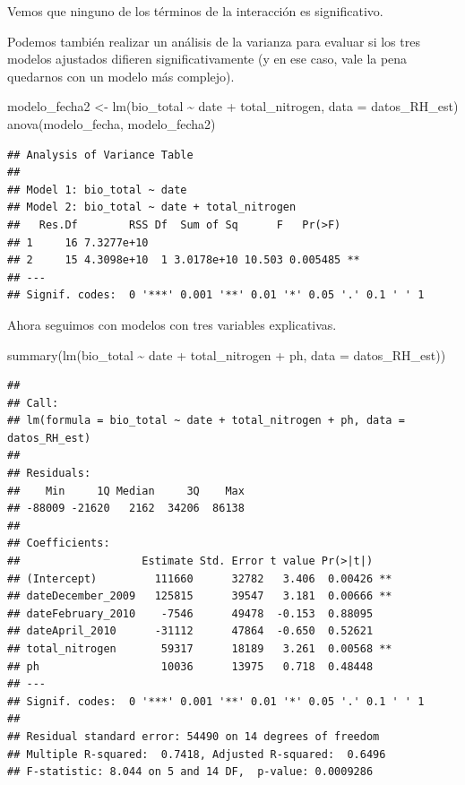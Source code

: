 \documentclass[
]{book}
\newenvironment{Shaded}{\begin{snugshade}}{\end{snugshade}}
\newcommand{\AttributeTok}[1]{\textcolor[rgb]{0.77,0.63,0.00}{#1}}
\newcommand{\FunctionTok}[1]{\textcolor[rgb]{0.00,0.00,0.00}{#1}}
\newcommand{\NormalTok}[1]{#1}
\newcommand{\OtherTok}[1]{\textcolor[rgb]{0.56,0.35,0.01}{#1}}
\newcommand{\SpecialCharTok}[1]{\textcolor[rgb]{0.00,0.00,0.00}{#1}}
\begin{document}
Vemos que ninguno de los términos de la interacción es significativo.

Podemos también realizar un análisis de la varianza para evaluar si los tres modelos ajustados difieren significativamente (y en ese caso, vale la pena quedarnos con un modelo más complejo).

\begin{Shaded}
\begin{Highlighting}[]
\NormalTok{modelo\_fecha2 }\OtherTok{\textless{}{-}} \FunctionTok{lm}\NormalTok{(bio\_total }\SpecialCharTok{\textasciitilde{}}\NormalTok{ date }\SpecialCharTok{+}\NormalTok{ total\_nitrogen, }\AttributeTok{data =}\NormalTok{ datos\_RH\_est)}
\FunctionTok{anova}\NormalTok{(modelo\_fecha, modelo\_fecha2)}
\end{Highlighting}
\end{Shaded}

\begin{verbatim}
## Analysis of Variance Table
## 
## Model 1: bio_total ~ date
## Model 2: bio_total ~ date + total_nitrogen
##   Res.Df        RSS Df  Sum of Sq      F   Pr(>F)   
## 1     16 7.3277e+10                                 
## 2     15 4.3098e+10  1 3.0178e+10 10.503 0.005485 **
## ---
## Signif. codes:  0 '***' 0.001 '**' 0.01 '*' 0.05 '.' 0.1 ' ' 1
\end{verbatim}

Ahora seguimos con modelos con tres variables explicativas.

\begin{Shaded}
\begin{Highlighting}[]
\FunctionTok{summary}\NormalTok{(}\FunctionTok{lm}\NormalTok{(bio\_total }\SpecialCharTok{\textasciitilde{}}\NormalTok{ date }\SpecialCharTok{+}\NormalTok{ total\_nitrogen }\SpecialCharTok{+}\NormalTok{ ph, }\AttributeTok{data =}\NormalTok{ datos\_RH\_est)) }
\end{Highlighting}
\end{Shaded}

\begin{verbatim}
## 
## Call:
## lm(formula = bio_total ~ date + total_nitrogen + ph, data = datos_RH_est)
## 
## Residuals:
##    Min     1Q Median     3Q    Max 
## -88009 -21620   2162  34206  86138 
## 
## Coefficients:
##                   Estimate Std. Error t value Pr(>|t|)   
## (Intercept)         111660      32782   3.406  0.00426 **
## dateDecember_2009   125815      39547   3.181  0.00666 **
## dateFebruary_2010    -7546      49478  -0.153  0.88095   
## dateApril_2010      -31112      47864  -0.650  0.52621   
## total_nitrogen       59317      18189   3.261  0.00568 **
## ph                   10036      13975   0.718  0.48448   
## ---
## Signif. codes:  0 '***' 0.001 '**' 0.01 '*' 0.05 '.' 0.1 ' ' 1
## 
## Residual standard error: 54490 on 14 degrees of freedom
## Multiple R-squared:  0.7418, Adjusted R-squared:  0.6496 
## F-statistic: 8.044 on 5 and 14 DF,  p-value: 0.0009286
\end{verbatim}
\end{document}
